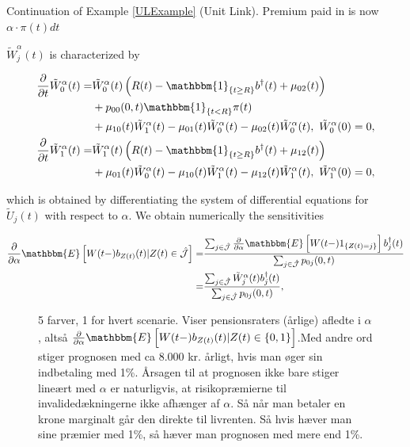 \documentclass{article}
\newcommand{\1}[1]{\mathbbm{1}_{\left\lbrace #1 \right\rbrace}}
\newcommand{\expec}[1][def]{\mathbbm{E} \left[ #1 \right]}
\theoremstyle{break}
\theoremstyle{remark}
\numberwithin{equation}{section}
\begin{document}
\begin{example}
Continuation of Example \ref{ULExample} (Unit Link). Premium paid in is now $\alpha \cdot \pi(t)dt$

$\tilde{W}_j^\alpha(t)$ is characterized by

\begin{align*}
\frac{\partial}{\partial t} \tilde{W}_0^\alpha(t) =& \tilde{W}_0^\alpha(t) \left( R(t) - \1{t \geq R} b^\dagger(t) + \mu_{02}(t) \right) \\
&+ p_{00}(0,t) \1{t<R} \pi(t) \\
&+ \mu_{10}(t) \tilde{W}_1^\alpha(t) - \mu_{01}(t) \tilde{W}_0^\alpha(t) - \mu_{02}(t) \tilde{W}_0^\alpha(t), \, \, \tilde{W}_0^\alpha(0) = 0, \\
\frac{\partial}{\partial t} \tilde{W}_1^\alpha(t) =& \tilde{W}_1^\alpha(t) \left( R(t) - \1{t \geq R} b^\dagger(t) + \mu_{12}(t) \right) \\
&+ \mu_{01}(t) \tilde{W}_0^\alpha(t) - \mu_{10}(t) \tilde{W}_1^\alpha(t) - \mu_{12}(t) \tilde{W}_1^\alpha(t), \, \, \tilde{W}_1^\alpha(0) = 0,
\end{align*}

which is obtained by differentiating the system of differential equations for $\tilde{U}_j(t)$ with respect to $\alpha$. We obtain numerically the sensitivities

\begin{align*}
\frac{\partial}{\partial \alpha} \expec[W(t-) b_{Z(t)}(t) | Z(t) \in \hat{\mathcal{J}}] =& \frac{\sum_{j \in \hat{\mathcal{J}}} \frac{\partial}{\partial \alpha} \expec[W(t-) 1_{\{Z(t)=j\}}] b_j^{\dagger}(t)}{\sum_{j \in \hat{\mathcal{J}}} p_{0j}(0,t)} \\
=& \frac{\sum_{j \in \hat{\mathcal{J}}} \tilde{W}_j^\alpha(t) b_j^{\dagger}(t)}{\sum_{j \in \hat{\mathcal{J}}} p_{0j}(0,t)},
\end{align*}

\begin{figure}[H]
	\caption{5 farver, 1 for hvert scenarie. Viser pensionsraters (årlige) afledte i $\alpha$, altså $\frac{\partial}{\partial \alpha} \expec[W(t-) b_{Z(t)}(t) | Z(t) \in \{0,1\}]$.Med andre ord stiger prognosen med ca 8.000 kr. årligt, hvis man øger sin indbetaling med 1\%. Årsagen til at prognosen ikke bare stiger lineært med $\alpha$ er naturligvis, at risikopræmierne til invalidedækningerne ikke afhænger af $\alpha$. Så når man betaler en krone marginalt går den direkte til livrenten. Så hvis hæver man sine præmier med 1\%, så hæver man prognosen med mere end 1\%.}
\end{figure}


\end{example}
\end{document}
